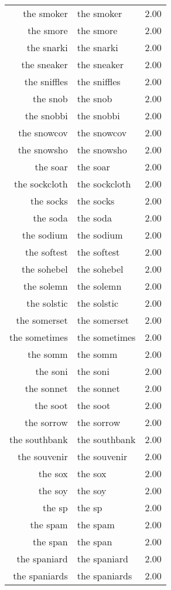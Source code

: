 \begin{table}[ht]
\begin{tabular}{rlr}
  the smoker & the smoker & 2.00 \\ 
  the smore & the smore & 2.00 \\ 
  the snarki & the snarki & 2.00 \\ 
  the sneaker & the sneaker & 2.00 \\ 
  the sniffles & the sniffles & 2.00 \\ 
  the snob & the snob & 2.00 \\ 
  the snobbi & the snobbi & 2.00 \\ 
  the snowcov & the snowcov & 2.00 \\ 
  the snowsho & the snowsho & 2.00 \\ 
  the soar & the soar & 2.00 \\ 
  the sockcloth & the sockcloth & 2.00 \\ 
  the socks & the socks & 2.00 \\ 
  the soda & the soda & 2.00 \\ 
  the sodium & the sodium & 2.00 \\ 
  the softest & the softest & 2.00 \\ 
  the sohebel & the sohebel & 2.00 \\ 
  the solemn & the solemn & 2.00 \\ 
  the solstic & the solstic & 2.00 \\ 
  the somerset & the somerset & 2.00 \\ 
  the sometimes & the sometimes & 2.00 \\ 
  the somm & the somm & 2.00 \\ 
  the soni & the soni & 2.00 \\ 
  the sonnet & the sonnet & 2.00 \\ 
  the soot & the soot & 2.00 \\ 
  the sorrow & the sorrow & 2.00 \\ 
  the southbank & the southbank & 2.00 \\ 
  the souvenir & the souvenir & 2.00 \\ 
  the sox & the sox & 2.00 \\ 
  the soy & the soy & 2.00 \\ 
  the sp & the sp & 2.00 \\ 
  the spam & the spam & 2.00 \\ 
  the span & the span & 2.00 \\ 
  the spaniard & the spaniard & 2.00 \\ 
  the spaniards & the spaniards & 2.00 \\ 

\end{tabular}
\end{table}
